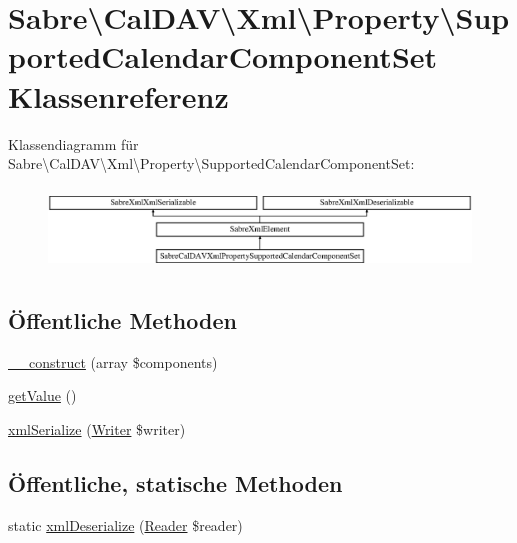 \hypertarget{class_sabre_1_1_cal_d_a_v_1_1_xml_1_1_property_1_1_supported_calendar_component_set}{}\section{Sabre\textbackslash{}Cal\+D\+AV\textbackslash{}Xml\textbackslash{}Property\textbackslash{}Supported\+Calendar\+Component\+Set Klassenreferenz}
\label{class_sabre_1_1_cal_d_a_v_1_1_xml_1_1_property_1_1_supported_calendar_component_set}
Klassendiagramm für Sabre\textbackslash{}Cal\+D\+AV\textbackslash{}Xml\textbackslash{}Property\textbackslash{}Supported\+Calendar\+Component\+Set\+:\begin{figure}[H]
\begin{center}
\leavevmode
\includegraphics[height=2.228117cm]{class_sabre_1_1_cal_d_a_v_1_1_xml_1_1_property_1_1_supported_calendar_component_set}
\end{center}
\end{figure}
\subsection*{Öffentliche Methoden}
\begin{DoxyCompactItemize}
\item 
\mbox{\hyperlink{class_sabre_1_1_cal_d_a_v_1_1_xml_1_1_property_1_1_supported_calendar_component_set_afeeb30a29eb8f0120ccab2c17865f216}{\+\_\+\+\_\+construct}} (array \$components)
\item 
\mbox{\hyperlink{class_sabre_1_1_cal_d_a_v_1_1_xml_1_1_property_1_1_supported_calendar_component_set_a11c088d0280ee3c07bbff8232a950c19}{get\+Value}} ()
\item 
\mbox{\hyperlink{class_sabre_1_1_cal_d_a_v_1_1_xml_1_1_property_1_1_supported_calendar_component_set_ae645b231b50c4ffb0e64b690843caa91}{xml\+Serialize}} (\mbox{\hyperlink{class_sabre_1_1_xml_1_1_writer}{Writer}} \$writer)
\end{DoxyCompactItemize}
\subsection*{Öffentliche, statische Methoden}
\begin{DoxyCompactItemize}
\item 
static \mbox{\hyperlink{class_sabre_1_1_cal_d_a_v_1_1_xml_1_1_property_1_1_supported_calendar_component_set_ab58cc0ee52dfd4bbf94716ec2deb2e74}{xml\+Deserialize}} (\mbox{\hyperlink{class_sabre_1_1_xml_1_1_reader}{Reader}} \$reader)
\end{DoxyCompactItemize}
